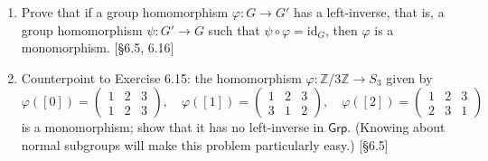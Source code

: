 \begin{enumerate}
    \item Prove that if a group homomorphism $\varphi: G \to G'$ has a left-inverse, that is, a group homomorphism $\psi: G' \to G$ such that $\psi \circ \varphi = \text{id}_G$, then $\varphi$ is a monomorphism. [\S6.5, 6.16]

    \item Counterpoint to Exercise 6.15: the homomorphism $\varphi: \mathbb{Z}/3\mathbb{Z} \to S_3$ given by
          \[ \varphi([0]) = \begin{pmatrix} 1 & 2 & 3 \\ 1 & 2 & 3 \end{pmatrix}, \quad \varphi([1]) = \begin{pmatrix} 1 & 2 & 3 \\ 3 & 1 & 2 \end{pmatrix}, \quad \varphi([2]) = \begin{pmatrix} 1 & 2 & 3 \\ 2 & 3 & 1 \end{pmatrix} \]
          is a monomorphism; show that it has no left-inverse in $\mathsf{Grp}$. (Knowing about normal subgroups will make this problem particularly easy.) [\S6.5]
\end{enumerate}